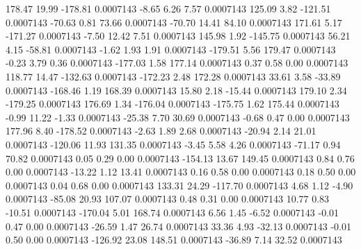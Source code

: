       178.47       19.99     -178.81     0.0007143
       -8.65        6.26        7.57     0.0007143
      125.09        3.82     -121.51     0.0007143
      -70.63        0.81       73.66     0.0007143
      -70.70       14.41       84.10     0.0007143
      171.61        5.17     -171.27     0.0007143
       -7.50       12.42        7.51     0.0007143
      145.98        1.92     -145.75     0.0007143
       56.21        4.15      -58.81     0.0007143
       -1.62        1.93        1.91     0.0007143
     -179.51        5.56      179.47     0.0007143
       -0.23        3.79        0.36     0.0007143
     -177.03        1.58      177.14     0.0007143
        0.37        0.58        0.00     0.0007143
      118.77       14.47     -132.63     0.0007143
     -172.23        2.48      172.28     0.0007143
       33.61        3.58      -33.89     0.0007143
     -168.46        1.19      168.39     0.0007143
       15.80        2.18      -15.44     0.0007143
      179.10        2.34     -179.25     0.0007143
      176.69        1.34     -176.04     0.0007143
     -175.75        1.62      175.44     0.0007143
       -0.99       11.22       -1.33     0.0007143
      -25.38        7.70       30.69     0.0007143
       -0.68        0.47        0.00     0.0007143
      177.96        8.40     -178.52     0.0007143
       -2.63        1.89        2.68     0.0007143
      -20.94        2.14       21.01     0.0007143
     -120.06       11.93      131.35     0.0007143
       -3.45        5.58        4.26     0.0007143
      -71.17        0.94       70.82     0.0007143
        0.05        0.29        0.00     0.0007143
     -154.13       13.67      149.45     0.0007143
        0.84        0.76        0.00     0.0007143
      -13.22        1.12       13.41     0.0007143
        0.16        0.58        0.00     0.0007143
        0.18        0.50        0.00     0.0007143
        0.04        0.68        0.00     0.0007143
      133.31       24.29     -117.70     0.0007143
        4.68        1.12       -4.90     0.0007143
      -85.08       20.93      107.07     0.0007143
        0.48        0.31        0.00     0.0007143
       10.77        0.83      -10.51     0.0007143
     -170.04        5.01      168.74     0.0007143
        6.56        1.45       -6.52     0.0007143
       -0.01        0.47        0.00     0.0007143
      -26.59        1.47       26.74     0.0007143
       33.36        4.93      -32.13     0.0007143
       -0.01        0.50        0.00     0.0007143
     -126.92       23.08      148.51     0.0007143
      -36.89        7.14       32.52     0.0007143
